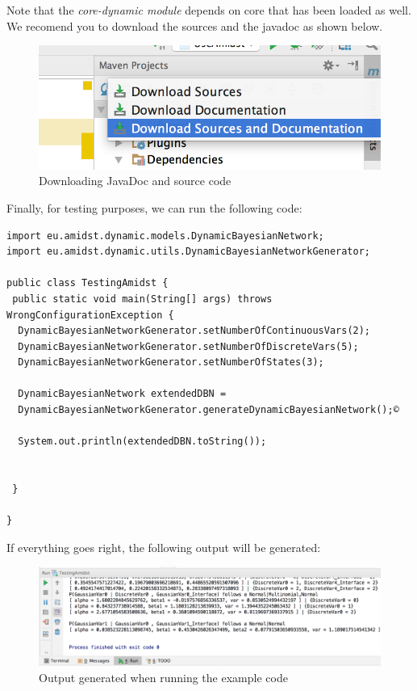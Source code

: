 \documentclass[10pt,a4paper]{article}
\begin{document}
Note that the \emph{core-dynamic module} depends on {core }{}that has
been loaded as well. We recomend you to download the sources and the
javadoc as shown below.


\begin{figure}[h!]
	\centering	
	\includegraphics[width=12cm]{img/use_amidst08.png}
	\caption{Downloading JavaDoc and source code}
\end{figure}

\newpage 


\noindent Finally, for testing purposes, we can run the following
code:\newline 

\begin{verbatim}
import eu.amidst.dynamic.models.DynamicBayesianNetwork;
import eu.amidst.dynamic.utils.DynamicBayesianNetworkGenerator;

public class TestingAmidst {
 public static void main(String[] args) throws WrongConfigurationException {
  DynamicBayesianNetworkGenerator.setNumberOfContinuousVars(2);
  DynamicBayesianNetworkGenerator.setNumberOfDiscreteVars(5);
  DynamicBayesianNetworkGenerator.setNumberOfStates(3);

  DynamicBayesianNetwork extendedDBN = 
  DynamicBayesianNetworkGenerator.generateDynamicBayesianNetwork();©  

  System.out.println(extendedDBN.toString());


 }

}
\end{verbatim}

\noindent If everything goes right, the following output will be
generated:\newline 


\begin{figure}[h!]
	\centering	
	\includegraphics[width=12cm]{img/use_amidst09.png}
	\caption{Output generated when running the example code}
\end{figure}
\end{document}
